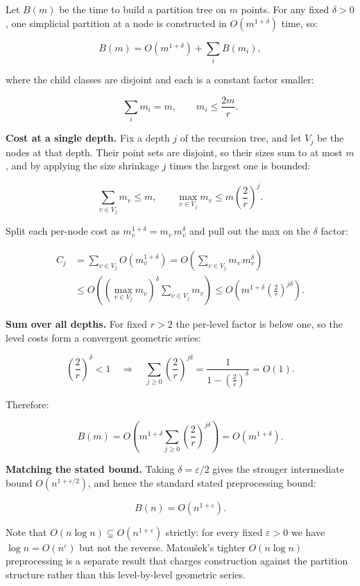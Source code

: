 \documentclass[
  11pt,
]{article}
\begin{document}
Let \(B(m)\) be the time to build a partition tree on \(m\) points. For
any fixed \(\delta>0\), one simplicial partition at a node is
constructed in \(O(m^{1+\delta})\) time, so:

\[
B(m)=O\left(m^{1+\delta}\right)+\sum_i B(m_i),
\]

where the child classes are disjoint and each is a constant factor
smaller:

\[
\sum_i m_i=m,\qquad m_i\le\frac{2m}{r}.
\]

\textbf{Cost at a single depth.} Fix a depth \(j\) of the recursion
tree, and let \(V_j\) be the nodes at that depth. Their point sets are
disjoint, so their sizes sum to at most \(m\), and by applying the size
shrinkage \(j\) times the largest one is bounded:

\[
\sum_{v\in V_j}m_v\le m,\qquad \max_{v\in V_j}m_v\le m\left(\frac{2}{r}\right)^j.
\]

Split each per-node cost as \(m_v^{1+\delta}=m_v\,m_v^{\delta}\) and
pull out the max on the \(\delta\) factor:

\[
\begin{aligned}
C_j
&=\sum_{v\in V_j}O\left(m_v^{1+\delta}\right)
 =O\!\left(\sum_{v\in V_j}m_v\,m_v^{\delta}\right)\\
&\le O\!\left(\left(\max_{v\in V_j}m_v\right)^{\delta}\sum_{v\in V_j}m_v\right)
 \le O\!\left(m^{1+\delta}\left(\frac{2}{r}\right)^{j\delta}\right).
\end{aligned}
\]

\textbf{Sum over all depths.} For fixed \(r>2\) the per-level factor is
below one, so the level costs form a convergent geometric series:

\[
\left(\frac{2}{r}\right)^{\delta}<1
\quad\Longrightarrow\quad
\sum_{j\ge0}\left(\frac{2}{r}\right)^{j\delta}=\frac{1}{1-\left(\frac{2}{r}\right)^{\delta}}=O(1).
\]

Therefore:

\[
B(m)=O\!\left(m^{1+\delta}\sum_{j\ge0}\left(\frac{2}{r}\right)^{j\delta}\right)=O\left(m^{1+\delta}\right).
\]

\textbf{Matching the stated bound.} Taking \(\delta=\varepsilon/2\)
gives the stronger intermediate bound \(O(n^{1+\varepsilon/2})\), and
hence the standard stated preprocessing bound:

\[
B(n)=O\left(n^{1+\varepsilon}\right).
\]

Note that \(O(n\log n)\subsetneq O(n^{1+\varepsilon})\) strictly: for
every fixed \(\varepsilon>0\) we have \(\log n=O(n^{\varepsilon})\) but
not the reverse. Matoušek's tighter \(O(n\log n)\) preprocessing is a
separate result that charges construction against the partition
structure rather than this level-by-level geometric series.
\end{document}
